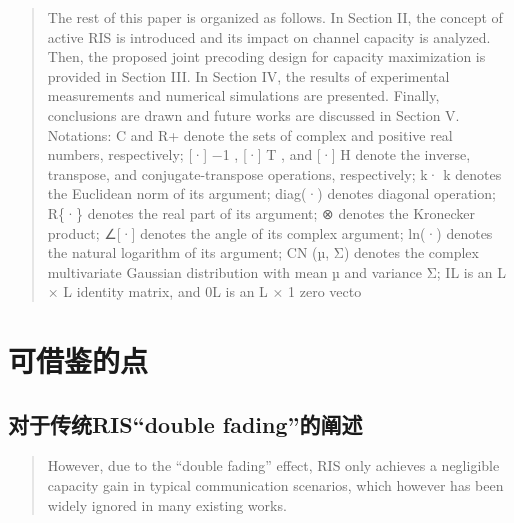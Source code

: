 \documentclass[UTF8]{ctexart}
\begin{document}
\begin{quote}
The rest of this paper is organized as follows. In Section II, the
concept of active RIS is introduced and its impact on channel capacity
is analyzed. Then, the proposed joint precoding design for capacity
maximization is provided in Section III. In Section IV, the results of
experimental measurements and numerical simulations are presented.
Finally, conclusions are drawn and future works are discussed in Section
V. Notations: C and R+ denote the sets of complex and positive real
numbers, respectively; {[}·{]} −1 , {[}·{]} T , and {[}·{]} H denote the
inverse, transpose, and conjugate-transpose operations, respectively; k·
k denotes the Euclidean norm of its argument; diag(·) denotes diagonal
operation; R\{·\} denotes the real part of its argument; ⊗ denotes the
Kronecker product; ∠{[}·{]} denotes the angle of its complex argument;
ln(·) denotes the natural logarithm of its argument; CN (µ, Σ) denotes
the complex multivariate Gaussian distribution with mean µ and variance
Σ; IL is an L × L identity matrix, and 0L is an L × 1 zero vecto
\end{quote}

    \hypertarget{ux53efux501fux9274ux7684ux70b9}{%
\section{可借鉴的点}\label{ux53efux501fux9274ux7684ux70b9}}

\hypertarget{ux5bf9ux4e8eux4f20ux7edfrisdouble-fadingux7684ux9610ux8ff0}{%
\subsection{对于传统RIS``double
fading''的阐述}\label{ux5bf9ux4e8eux4f20ux7edfrisdouble-fadingux7684ux9610ux8ff0}}

\begin{quote}
However, due to the ``double fading'' effect, RIS only achieves a
negligible capacity gain in typical communication scenarios, which
however has been widely ignored in many existing works.
\end{quote}
\end{document}
